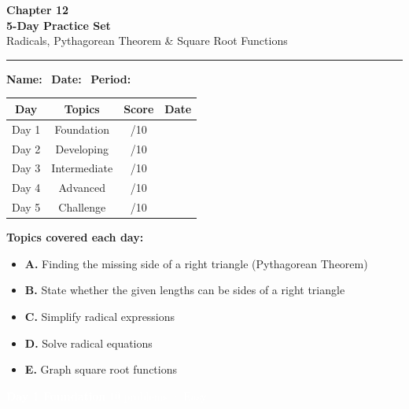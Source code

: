 \documentclass[11pt]{article}
\newcommand{\dayhdr}[3]{%
  \newpage
  \noindent\colorbox{#2}{\parbox{\linewidth}{%
    \vspace{6pt}\hspace{8pt}
    {\LARGE\textbf{\textcolor{white}{#1}}}
    \hfill
    {\normalsize\textcolor{white}{#3}}
    \vspace{6pt}
  }}
  \vspace{4pt}
}
\begin{document}
\begin{center}
  {\Huge\textbf{\textcolor{day1}{Chapter 12}}}\\[6pt]
  {\LARGE\textbf{5-Day Practice Set}}\\[4pt]
  {\large Radicals, Pythagorean Theorem \& Square Root Functions}\\[8pt]
  \rule{\linewidth}{2pt}
\end{center}

\medskip
\noindent\textbf{Name:}~\underline{\hspace{5cm}}
\quad\textbf{Date:}~\underline{\hspace{3cm}}
\quad\textbf{Period:}~\underline{\hspace{2cm}}

\bigskip
\begin{center}
\renewcommand{\arraystretch}{1.6}
\begin{tabular}{|c|c|c|c|}
\hline
\textbf{Day} & \textbf{Topics} & \textbf{Score} & \textbf{Date} \\
\hline
Day 1 & Foundation & \quad /10 & \\
\hline
Day 2 & Developing & \quad /10 & \\
\hline
Day 3 & Intermediate & \quad /10 & \\
\hline
Day 4 & Advanced & \quad /10 & \\
\hline
Day 5 & Challenge & \quad /10 & \\
\hline
\end{tabular}
\end{center}

\bigskip
\noindent\textbf{Topics covered each day:}
\begin{itemize}[itemsep=2pt]
  \item \textbf{A.} Finding the missing side of a right triangle (Pythagorean Theorem)
  \item \textbf{B.} State whether the given lengths can be sides of a right triangle
  \item \textbf{C.} Simplify radical expressions
  \item \textbf{D.} Solve radical equations
  \item \textbf{E.} Graph square root functions
\end{itemize}

\dayhdr{Day 1 \quad Foundation}{day1}{10 problems · Easy}
\end{document}

